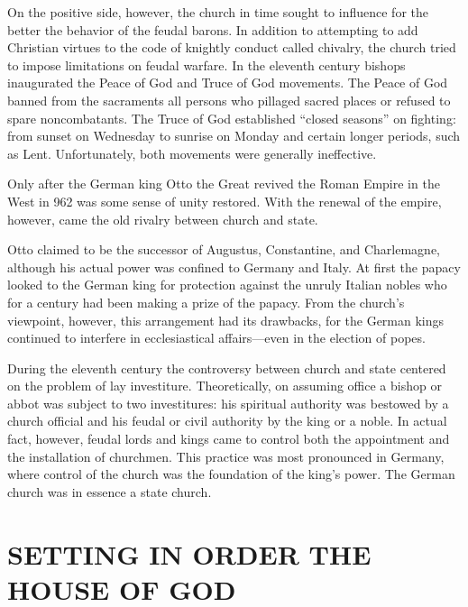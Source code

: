 On the positive side, however, the church in time sought to influence for the better the behavior of
the feudal barons. In addition to attempting to add Christian virtues to the code of knightly
conduct called chivalry, the church tried to impose limitations on feudal warfare. In the eleventh
century bishops inaugurated the Peace of God and Truce of God movements. The Peace of God banned
from the sacraments all persons who pillaged sacred places or refused to spare noncombatants. The
Truce of God established “closed seasons” on fighting: from sunset on Wednesday to sunrise on Monday
and certain longer periods, such as Lent. Unfortunately, both movements were generally ineffective.

Only after the German king Otto the Great revived the Roman Empire in the West in 962 was some sense
of unity restored. With the renewal of the empire, however, came the old rivalry between church and
state.

\begin{blockquote}
Otto claimed to be the successor of Augustus, Constantine, and Charlemagne, although his actual
power was confined to Germany and Italy. At first the papacy looked to the German king for
protection against the unruly Italian nobles who for a century had been making a prize of the
papacy. From the church’s viewpoint, however, this arrangement had its drawbacks, for the German
kings continued to interfere in ecclesiastical affairs—even in the election of popes.
\end{blockquote}

During the eleventh century the controversy between church and state centered on the problem of lay
investiture. Theoretically, on assuming office a bishop or abbot was subject to two investitures:
his spiritual authority was bestowed by a church official and his feudal or civil authority by the
king or a noble. In actual fact, however, feudal lords and kings came to control both the
appointment and the installation of churchmen. This practice was most pronounced in Germany, where
control of the church was the foundation of the king’s power. The German church was in essence a
state church.

\section{SETTING IN ORDER THE HOUSE OF GOD}

